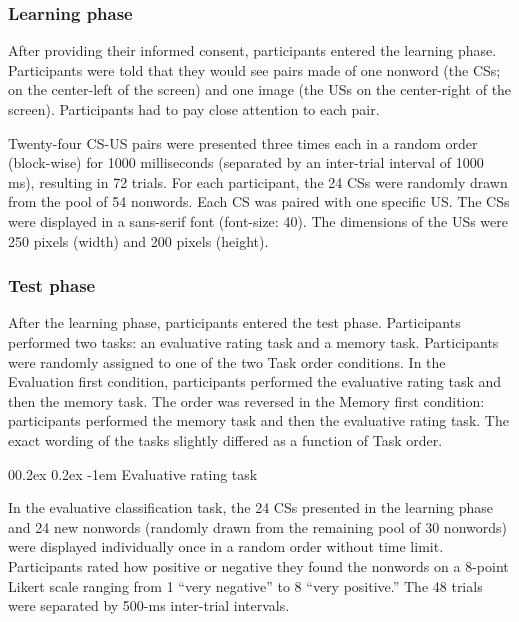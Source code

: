 \documentclass[
  man,floatsintext]{apa6}
\makeatletter
\let\oldparagraph\paragraph
\renewcommand{\paragraph}[1]{\oldparagraph{#1}\mbox{}}
\renewcommand{\paragraph}{\@startsection{paragraph}{4}{\parindent}%
  {0\baselineskip \@plus 0.2ex \@minus 0.2ex}%
  {-1em}%
  {\normalfont\normalsize\bfseries\itshape\typesectitle}}
\makeatother
\begin{document}
\hypertarget{learning-phase}{%
\subsubsection{Learning phase}\label{learning-phase}}

After providing their informed consent, participants entered the learning phase. Participants were told that they would see pairs made of one nonword (the CSs; on the center-left of the screen) and one image (the USs on the center-right of the screen). Participants had to pay close attention to each pair.

Twenty-four CS-US pairs were presented three times each in a random order (block-wise) for 1000 milliseconds (separated by an inter-trial interval of 1000 ms), resulting in 72 trials. For each participant, the 24 CSs were randomly drawn from the pool of 54 nonwords. Each CS was paired with one specific US. The CSs were displayed in a sans-serif font (font-size: 40). The dimensions of the USs were 250 pixels (width) and 200 pixels (height).

\hypertarget{test-phase}{%
\subsubsection{Test phase}\label{test-phase}}

After the learning phase, participants entered the test phase. Participants performed two tasks: an evaluative rating task and a memory task. Participants were randomly assigned to one of the two Task order conditions. In the Evaluation first condition, participants performed the evaluative rating task and then the memory task. The order was reversed in the Memory first condition: participants performed the memory task and then the evaluative rating task. The exact wording of the tasks slightly differed as a function of Task order.

\hypertarget{evaluative-rating-task}{%
\paragraph{Evaluative rating task}\label{evaluative-rating-task}}

In the evaluative classification task, the 24 CSs presented in the learning phase and 24 new nonwords (randomly drawn from the remaining pool of 30 nonwords) were displayed individually once in a random order without time limit. Participants rated how positive or negative they found the nonwords on a 8-point Likert scale ranging from 1 ``very negative'' to 8 ``very positive.'' The 48 trials were separated by 500-ms inter-trial intervals.
\end{document}
